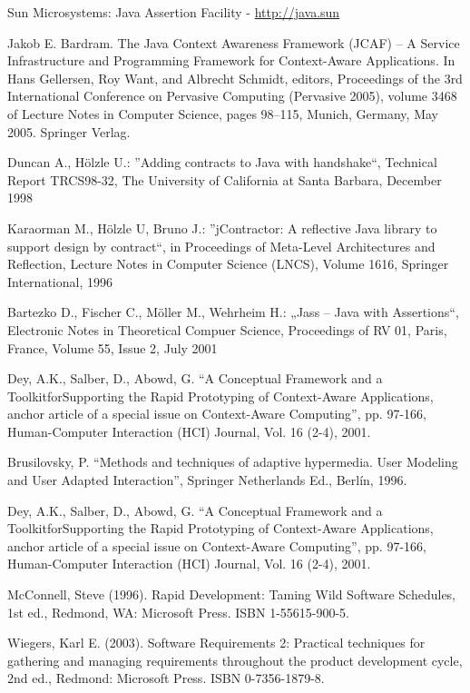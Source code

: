 \begin{thebibliography}{1}
{ Sun Microsystems: Java Assertion Facility -
\url{http://java.sun}

Jakob E. Bardram. The Java Context Awareness Framework (JCAF) –
A Service Infrastructure and Programming Framework for Context-Aware
Applications. In Hans Gellersen, Roy Want, and Albrecht Schmidt, editors,
Proceedings of the 3rd International Conference on Pervasive Computing
(Pervasive 2005), volume 3468 of Lecture Notes in Computer Science, pages
98–115, Munich, Germany, May 2005. Springer Verlag.


Duncan A., Hölzle U.: ''Adding contracts to Java with handshake``,
Technical Report TRCS98-32, The University of California at Santa
Barbara, December 1998

Karaorman M., Hölzle U, Bruno J.: ''jContractor: A
reflective Java
library to support design by contract``, in Proceedings of Meta-Level
Architectures and Reflection, Lecture Notes in Computer Science
(LNCS), Volume 1616, Springer International, 1996

Bartezko D., Fischer C., Möller M., Wehrheim H.: „Jass – Java with
Assertions“, Electronic Notes in Theoretical Compuer Science,
Proceedings of RV 01, Paris, France, Volume 55, Issue 2, July 2001

Dey, A.K., Salber, D., Abowd, G. “A Conceptual Framework and a
ToolkitforSupporting the Rapid Prototyping of Context-Aware Applications, anchor
article of a special issue on Context-Aware Computing”, pp.
97-166, Human-Computer  Interaction (HCI) Journal, Vol. 16 (2-4), 2001.

Brusilovsky, P. “Methods and techniques of adaptive hypermedia. User Modeling
and User Adapted Interaction”, Springer Netherlands Ed., Berlín, 1996. 

Dey, A.K., Salber, D., Abowd, G. “A Conceptual Framework and a
ToolkitforSupporting the Rapid Prototyping of Context-Aware Applications, anchor
article of a special issue on Context-Aware Computing”, pp.
97-166, Human-Computer  Interaction (HCI) Journal, Vol. 16 (2-4), 2001.



 McConnell, Steve (1996). Rapid Development: Taming
Wild Software Schedules, 1st ed., Redmond, WA: Microsoft Press. ISBN
1-55615-900-5.


 Wiegers, Karl E. (2003). Software Requirements 2:
Practical techniques for gathering and managing requirements throughout the
product development cycle, 2nd ed., Redmond: Microsoft Press. ISBN
0-7356-1879-8.


}
\end{thebibliography}
